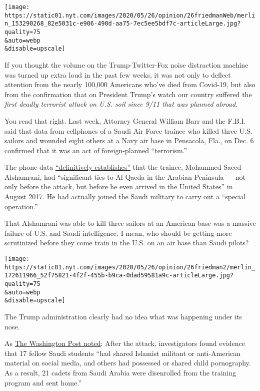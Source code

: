 \texttt{[image: https://static01.nyt.com/images/2020/05/26/opinion/26friedmanWeb/merlin\_153290268\_82e5031c-e906-490d-aa75-7ec5ee5bdf7c-articleLarge.jpg?quality=75\\\&auto=webp\\\&disable=upscale]}

If you thought the volume on the Trump-Twitter-Fox noise distraction
machine was turned up extra loud in the past few weeks, it was not only
to deflect attention from the nearly 100,000 Americans who've died from
Covid-19, but also from the confirmation that on President Trump's watch
our country suffered the \emph{first deadly terrorist attack on U.S.
soil since 9/11 that was planned abroad.}

You read that right. Last week, Attorney General William Barr and the
F.B.I. said that data from cellphones of a Saudi Air Force trainee who
killed three U.S. sailors and wounded eight others at a Navy air base in
Pensacola, Fla., on Dec. 6 confirmed that it was an act of
foreign-planned ``terrorism.''

The phone data
\href{https://www.justice.gov/opa/pr/attorney-general-william-p-barr-and-fbi-director-christopher-wray-announce-significant}{``definitively
establishes''} that the trainee, Mohammed Saeed Alshamrani, had
``significant ties to Al Qaeda in the Arabian Peninsula --- not only
before the attack, but before he even arrived in the United States'' in
August 2017. He had actually joined the Saudi military to carry out a
``special operation.''

That Alshamrani was able to kill three sailors at an American base was a
massive failure of U.S. and Saudi intelligence. I mean, who should be
getting more scrutinized before they come train in the U.S. on an air
base than Saudi pilots?

\texttt{[image: https://static01.nyt.com/images/2020/05/26/opinion/26friedman2/merlin\_172611966\_52f75821-4f2f-455b-b9ca-0dad59581a9c-articleLarge.jpg?quality=75\\\&auto=webp\\\&disable=upscale]}

The Trump administration clearly had no idea what was happening under
its nose.

As
\href{https://www.washingtonpost.com/national-security/fbi-links-al-qaeda-to-saudi-gunman-who-killed-three-us-sailors-in-pensacola-last-year/2020/05/18/b34e3f7a-990f-11ea-89fd-28fb313d1886_story.html}{The
Washington Post noted}: After the attack, investigators found evidence
that 17 fellow Saudi students ``had shared Islamist militant or
anti-American material on social media, and others had possessed or
shared child pornography. As a result, 21 cadets from Saudi Arabia were
disenrolled from the training program and sent home.''

